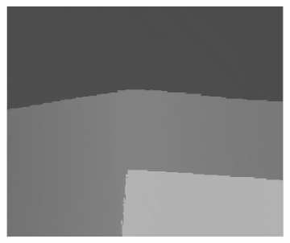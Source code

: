 \documentclass[preprint,10pt,5p,times,twocolumn]{elsarticle}
\begin{document}
\begin{figure}[t]
\begin{center}
\begin{subfigure}[b]{0.136\linewidth}
    \includegraphics[width=\linewidth]{cmp_book_8X_MST_part.png}
    \label{fig:} %
\end{subfigure}


\end{center}
\end{figure}
\end{document}
